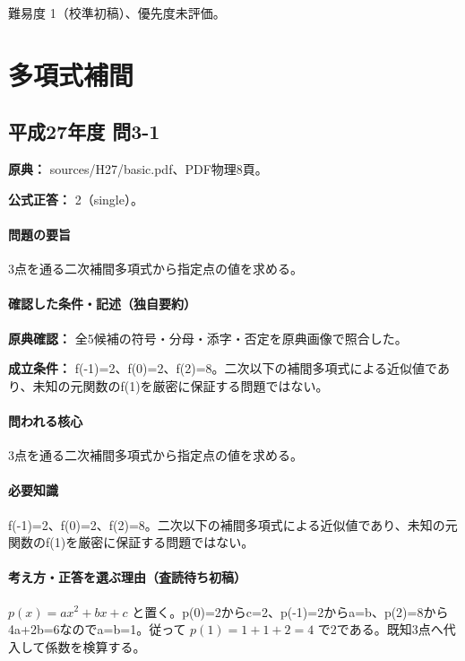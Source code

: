 \par 難易度 1（校準初稿）、優先度未評価。

\section{多項式補間}

\subsection{平成27年度 問3-1}
\label{q:h27-reg-basic-3-1}

\noindent\textbf{原典：} sources/H27/basic.pdf、PDF物理8頁。

\textbf{公式正答：} 2（single）。

\paragraph{問題の要旨} 3点を通る二次補間多項式から指定点の値を求める。

\paragraph{確認した条件・記述（独自要約）}\mbox{}\par

\noindent\textbf{原典確認：} 全5候補の符号・分母・添字・否定を原典画像で照合した。\par

\noindent\textbf{成立条件：} f(-1)=\allowbreak{}2、f(0)=\allowbreak{}2、f(2)=\allowbreak{}8。二次以下の補間多項式による近似値であり、未知の元関数のf(1)を厳密に保証する問題ではない。\par

\paragraph{問われる核心} 3点を通る二次補間多項式から指定点の値を求める。

\paragraph{必要知識} f(-1)=\allowbreak{}2、f(0)=\allowbreak{}2、f(2)=\allowbreak{}8。二次以下の補間多項式による近似値であり、未知の元関数のf(1)を厳密に保証する問題ではない。

\paragraph{考え方・正答を選ぶ理由（査読待ち初稿）} \(p(x)=ax^2+bx+c\) と置く。p(0)=\allowbreak{}2からc=\allowbreak{}2、p(-1)=\allowbreak{}2からa=\allowbreak{}b、p(2)=\allowbreak{}8から4a+2b=\allowbreak{}6なのでa=\allowbreak{}b=\allowbreak{}1。従って \(p(1)=1+1+2=4\) で2である。既知3点へ代入して係数を検算する。

